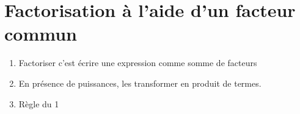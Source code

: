 %	

%	 



\newpage 
{}  
\pagestyle{scrheadings} %

\onehalfspacing    
\section{Factorisation à l'aide d'un facteur commun}
\begin{tBox}
\begin{enumerate}[label=\textbullet,leftmargin=*]
	\item Factoriser c'est écrire une expression comme somme de facteurs
	\item En présence de puissances, les transformer en produit de termes.
	\item \og Règle du 1 \fg{}
\end{enumerate} 
\end{tBox}
